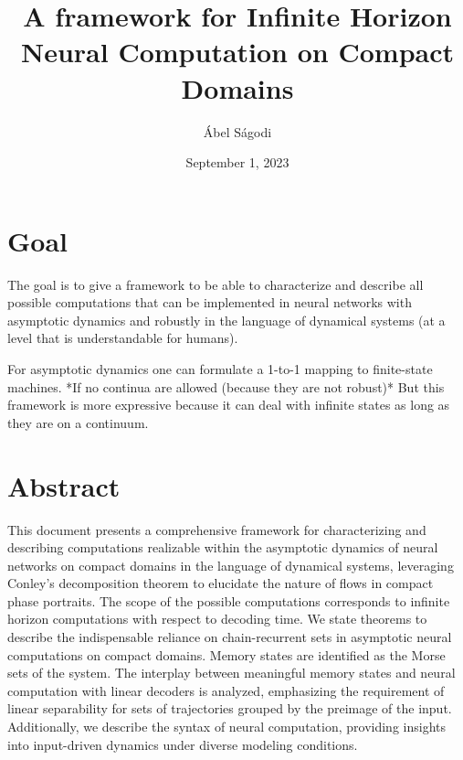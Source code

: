 \documentclass{scrartcl}
\title{A framework for Infinite Horizon Neural Computation on Compact Domains}
\author{\'Abel S\'agodi}
\date{September 1, 2023}
\theoremstyle{definition}
\theoremstyle{remark}
\begin{document}
\maketitle


\section*{Goal}
The goal is to give a framework to be able to characterize and describe all possible computations that can be implemented in neural networks with asymptotic dynamics and robustly in the language of dynamical systems (at a level that is understandable for humans).

For asymptotic dynamics one can formulate a 1-to-1 mapping to finite-state machines. *If no continua are allowed (because they are not robust)*
But this framework is more expressive because it can deal with infinite states as long as they are on a continuum.


\section*{Abstract}
This document presents a comprehensive framework for characterizing and describing computations realizable within the asymptotic dynamics of neural networks on compact domains in the language of dynamical systems,  leveraging Conley's decomposition theorem to elucidate the nature of flows in compact phase portraits. The scope of the possible computations corresponds to infinite horizon computations with respect to decoding time. We state theorems to describe the indispensable reliance on chain-recurrent sets in asymptotic neural computations on compact domains. Memory states are identified as the Morse sets of the system. The interplay between meaningful memory states and neural computation with linear decoders is analyzed, emphasizing the requirement of linear separability for sets of trajectories grouped by the preimage of the input. 
Additionally, we describe the syntax of neural computation, providing insights into input-driven dynamics under diverse modeling conditions. 

\newpage
\end{document}
